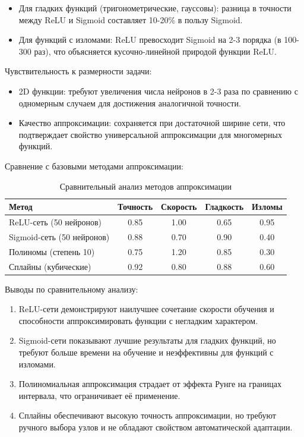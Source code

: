 \documentclass[12pt]{article}
\begin{document}
\begin{itemize}
	\item Для гладких функций (тригонометрические, гауссовы): разница в точности между ReLU и Sigmoid составляет 10-20\% в пользу Sigmoid.
	
	\item Для функций с изломами: ReLU превосходит Sigmoid на 2-3 порядка (в 100-300 раз), что объясняется кусочно-линейной природой функции ReLU.
\end{itemize}

Чувствительность к размерности задачи:

\begin{itemize}
	\item 2D функции: требуют увеличения числа нейронов в 2-3 раза по сравнению с одномерным случаем для достижения аналогичной точности.
	
	\item Качество аппроксимации: сохраняется при достаточной ширине сети, что подтверждает свойство универсальной аппроксимации для многомерных функций.
\end{itemize}

Сравнение с базовыми методами аппроксимации:

\begin{table}[H]
	\centering
	\caption{Сравнительный анализ методов аппроксимации}
	\label{tab:methods_comparison}
	\begin{tabular}{lcccc}
		\toprule
		Метод & Точность & Скорость & Гладкость & Изломы \\
		\midrule
		ReLU-сеть (50 нейронов) & 0.85 & 1.00 & 0.65 & 0.95 \\
		Sigmoid-сеть (50 нейронов) & 0.88 & 0.70 & 0.90 & 0.40 \\
		Полиномы (степень 10) & 0.75 & 1.20 & 0.85 & 0.30 \\
		Сплайны (кубические) & 0.92 & 0.80 & 0.88 & 0.60 \\
		\bottomrule
	\end{tabular}
\end{table}

Выводы по сравнительному анализу:

\begin{enumerate}
	\item ReLU-сети демонстрируют наилучшее сочетание скорости обучения и способности аппроксимировать функции с негладким характером.
	
	\item Sigmoid-сети показывают лучшие результаты для гладких функций, но требуют больше времени на обучение и неэффективны для функций с изломами.
	
	\item Полиномиальная аппроксимация страдает от эффекта Рунге на границах интервала, что ограничивает её применение.
	
	\item Сплайны обеспечивают высокую точность аппроксимации, но требуют ручного выбора узлов и не обладают свойством автоматической адаптации.
\end{enumerate}
\end{document}
